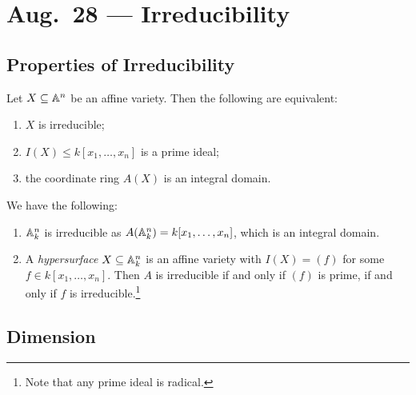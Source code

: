 \chapter{Aug.~28 --- Irreducibility}

\section{Properties of Irreducibility}
\begin{prop}
  Let $X \subseteq \mathbb{A}^n$ be an
  affine variety. Then the following are equivalent:
  \begin{enumerate}
    \item $X$ is irreducible;
    \item $I(X) \le k[x_1, \dots, x_n]$
      is a prime ideal;
    \item the coordinate ring $A(X)$
      is an integral domain.
  \end{enumerate}
\end{prop}

\begin{example}
  We have the following:
  \begin{enumerate}
    \item $\mathbb{A}_k^n$ is irreducible
      as $A(\mathbb{A}_k^n) = k[x_1, \dots, x_n]$,
      which is an integral domain.
    \item A \emph{hypersurface}
      $X \subseteq \mathbb{A}_k^n$ is
      an affine variety with $I(X) = (f)$
      for some $f \in k[x_1, \dots, x_n]$.
      Then $A$ is irreducible if and only
      if $(f)$ is prime, if and only if
      $f$ is irreducible.\footnote{Note that any prime ideal is radical.}
  \end{enumerate}
\end{example}

\section{Dimension}
